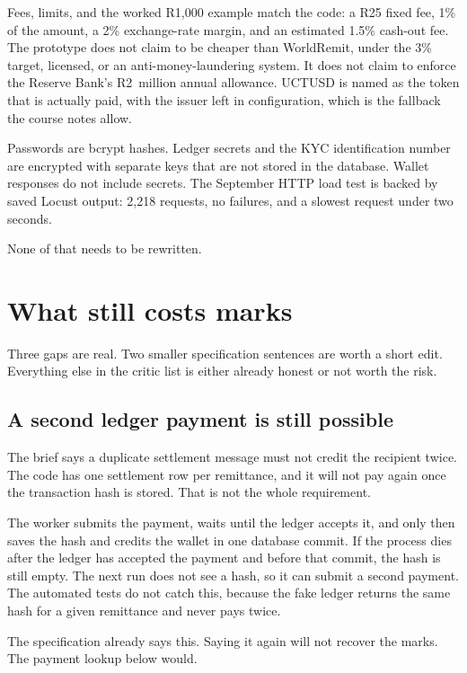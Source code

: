 \documentclass[11pt,a4paper]{article}
\begin{document}
Fees, limits, and the worked R1{,}000 example match the code: a R25 fixed fee, 1\% of the amount, a 2\% exchange-rate margin, and an estimated 1.5\% cash-out fee. The prototype does not claim to be cheaper than WorldRemit, under the 3\% target, licensed, or an anti-money-laundering system. It does not claim to enforce the Reserve Bank's R2~million annual allowance. UCTUSD is named as the token that is actually paid, with the issuer left in configuration, which is the fallback the course notes allow.

Passwords are bcrypt hashes. Ledger secrets and the KYC identification number are encrypted with separate keys that are not stored in the database. Wallet responses do not include secrets. The September HTTP load test is backed by saved Locust output: 2{,}218 requests, no failures, and a slowest request under two seconds.

None of that needs to be rewritten.

\section{What still costs marks}

Three gaps are real. Two smaller specification sentences are worth a short edit. Everything else in the critic list is either already honest or not worth the risk.

\subsection{A second ledger payment is still possible}

The brief says a duplicate settlement message must not credit the recipient twice. The code has one settlement row per remittance, and it will not pay again once the transaction hash is stored. That is not the whole requirement.

The worker submits the payment, waits until the ledger accepts it, and only then saves the hash and credits the wallet in one database commit. If the process dies after the ledger has accepted the payment and before that commit, the hash is still empty. The next run does not see a hash, so it can submit a second payment. The automated tests do not catch this, because the fake ledger returns the same hash for a given remittance and never pays twice.

The specification already says this. Saying it again will not recover the marks. The payment lookup below would.
\end{document}
